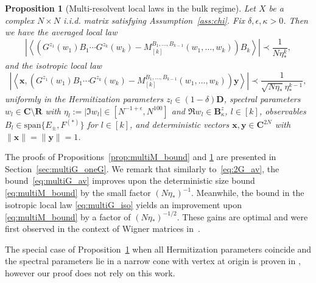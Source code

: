 \documentclass[10pt]{amsart}
\newtheorem{proposition}[theorem]{Proposition}
\numberwithin{equation}{section}
\newcommand{\R}{\mathbf{R}}
\newcommand{\C}{\mathbf{C}}
\begin{document}
\begin{proposition}[Multi-resolvent local laws in the bulk regime]\label{prop:multiG_oneG}
Let $X$ be a complex $N\times N$ i.i.d. matrix satisfying Assumption~\ref{ass:chi}. Fix $\delta,\epsilon,\kappa>0$. Then we have the \emph{averaged} local law
\begin{equation}
\left\vert \left\langle \left(G^{z_1}(w_1)B_1\cdots G^{z_k}(w_k) - M_{[k]}^{B_1,\ldots,B_{k-1}}(w_1,\ldots,w_k)\right)B_k\right\rangle\right\vert \prec \frac{1}{N\eta_*^k},
\label{eq:multiG_av}
\end{equation}
and the \emph{isotropic} local law
\begin{equation}
\left\vert \left\langle \bm{x},\left(G^{z_1}(w_1)B_1\cdots G^{z_k}(w_k) - M_{[k]}^{B_1,\ldots,B_{k-1}}(w_1,\ldots,w_k)\right)\bm{y}\right\rangle\right\vert \prec \frac{1}{\sqrt{N\eta_*}\eta_*^{k-1}},
\label{eq:multiG_iso}
\end{equation}
uniformly in the Hermitization parameters $z_l\in( 1-\delta)\mathbf{D}$, spectral parameters $w_l\in\C\setminus\R$ with $\eta_l:=|\Im w_l|\in [N^{-1+\epsilon}, N^{100}]$ and $\Re w_l\in\mathbf{B}_\kappa^z$, $l\in [k]$, observables $B_l\in\mathrm{span}\{E_\pm,F^{(*)}\}$ for $l\in[k]$, and deterministic vectors $\bm{x},\bm{y}\in\C^{2N}$ with $\|\bm{x}\|=\|\bm{y}\|=1$.
\end{proposition}

The proofs of Propositions~\ref{prop:multiM_bound} and \ref{prop:multiG_oneG} are presented in Section~\ref{sec:multiG_oneG}. We remark that similarly to~\eqref{eq:2G_av}, the bound~\eqref{eq:multiG_av} improves upon the deterministic size bound \eqref{eq:multiM_bound} by the small factor $(N\eta_*)^{-1}$. Meanwhile, the bound in the isotropic local law \eqref{eq:multiG_iso} yields an improvement upon \eqref{eq:multiM_bound} by a factor of $(N\eta_*)^{-1/2}$. These gains are optimal and were first observed in the context of Wigner matrices in~\cite[Theorem 2.5]{Multi_res_llaws}. 

The special case of Proposition~\ref{prop:multiG_oneG} when all Hermitization parameters coincide and the spectral parameters lie in a narrow cone with vertex at origin is proven in \cite[Theorem 1.3]{sparse_universality_Osman}, however our proof does not rely on this work.
\end{document}
